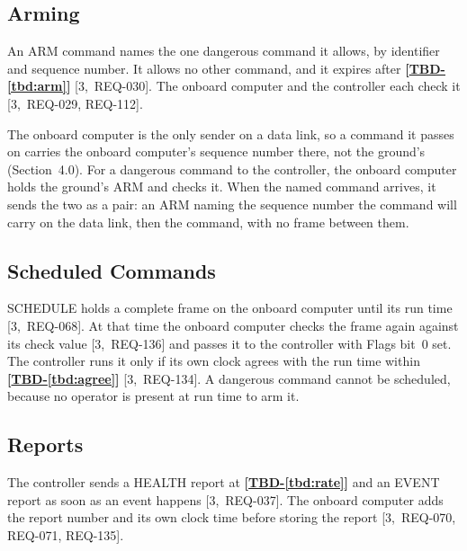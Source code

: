 \documentclass[11pt,a4paper]{article}
\newcommand{\tbd}[1]{\mbox{\textbf{[\hyperref[tbd:#1]{TBD-\ref*{tbd:#1}}]}}}
\begin{document}
\vspace{-0.8em}

\subsection{Arming}
An ARM command names the one dangerous command it allows, by identifier and
sequence number. It allows no other command, and it expires after
\tbd{arm} [3,~REQ-030]. The onboard computer and the controller each check it
[3,~REQ-029, REQ-112].

The onboard computer is the only sender on a data link, so a command it passes
on carries the onboard computer's sequence number there, not the ground's
(Section~4.0). For a dangerous command to the controller, the onboard computer
holds the ground's ARM and checks it. When the named command arrives, it sends
the two as a pair: an ARM naming the sequence number the command will carry on
the data link, then the command, with no frame between them.

\subsection{Scheduled Commands}
\label{sec:sched}
SCHEDULE holds a complete frame on the onboard computer until its run time
[3,~REQ-068]. At that time the onboard computer checks the frame again
against its check value [3,~REQ-136] and passes it to the controller with
Flags bit~0 set. The controller runs it only if its own clock agrees with the
run time within \tbd{agree} [3,~REQ-134]. A dangerous command cannot be
scheduled, because no operator is present at run time to arm it.

\subsection{Reports}
The controller sends a HEALTH report at \tbd{rate} and an EVENT report as
soon as an event happens [3,~REQ-037]. The onboard computer adds the report
number and its own clock time before storing the report [3,~REQ-070, REQ-071,
REQ-135].
\end{document}
